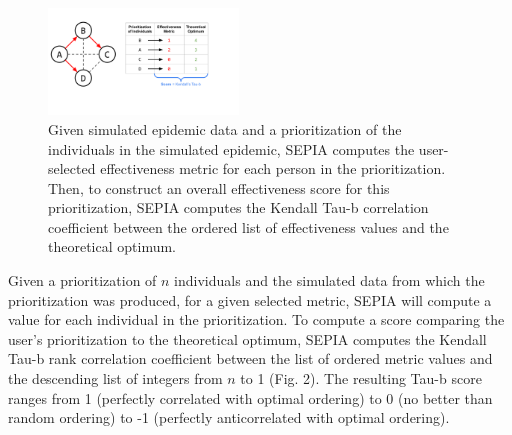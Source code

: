 \documentclass[twocolumn]{bmcart}%
\begin{document}

\begin{figure}[!h]
\centering
\includegraphics[width=0.45\textwidth]{Figures/Fig2.pdf}
\caption{Given simulated epidemic data and a prioritization of the individuals in the simulated epidemic, SEPIA computes the user-selected effectiveness metric for each person in the prioritization. Then, to construct an overall effectiveness score for this prioritization, SEPIA computes the Kendall Tau-b correlation coefficient between the ordered list of effectiveness values and the theoretical optimum.}
\end{figure}

Given a prioritization of $n$ individuals and the simulated data from which the prioritization was produced, for a given selected metric, SEPIA will compute a value for each individual in the prioritization.
To compute a score comparing the user's prioritization to the theoretical optimum,
SEPIA computes the Kendall Tau-b rank correlation coefficient \cite{kendall1938new}
between the list of ordered metric values and the descending list of integers from $n$ to 1 (Fig. 2). The resulting Tau-b score ranges from 1 (perfectly correlated with optimal ordering) to 0 (no better than random ordering) to -1 (perfectly anticorrelated with optimal ordering).
\end{document}
